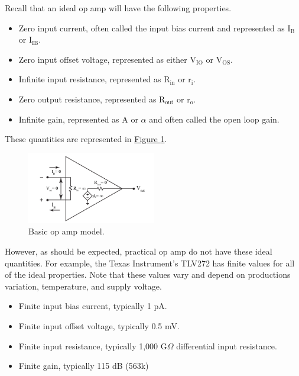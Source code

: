 Recall that an ideal op amp will have the following properties. 

\begin{itemize}
	\item Zero input current, often called the input bias current and represented as $\mathrm{I_B}$ or $\mathrm{I_{IB}}$. 
	\item Zero input offset voltage, represented as either $\mathrm{V_{IO}}$ or $\mathrm{V_{OS}}$.
	\item Infinite input resistance, represented as $\mathrm{R_{in}}$ or $\mathrm{r_i}$.  
	\item Zero output resistance, represented as $\mathrm{R_{out}}$ or $\mathrm{r_o}$.
	\item Infinite gain, represented as A or $\alpha$ and often called the open loop gain.
\end{itemize}

\noindent These quantities are represented in \hyperref[fig:IdealAmp]{Figure \ref*{fig:IdealAmp}}.

\begin{figure}[h]
	\centering
		\includegraphics[width=0.5\textwidth]{Lab4idealOpAmp.pdf}
	\caption{Basic op amp model.} \label{fig:IdealAmp}
\end{figure}

However, as should be expected, practical op amp do not have these ideal quantities. For example, the Texas Instrument's TLV272 has finite values for all of the ideal properties. Note that these values vary and depend on productions variation, temperature, and supply voltage.

\begin{itemize}
	\item Finite input bias current, typically 1 pA.
	\item Finite input offset voltage, typically 0.5 mV.
	\item Finite input resistance, typically 1,000 G$\Omega$ differential input resistance.
	\item Finite gain, typically 115 dB (563k)
\end{itemize}


